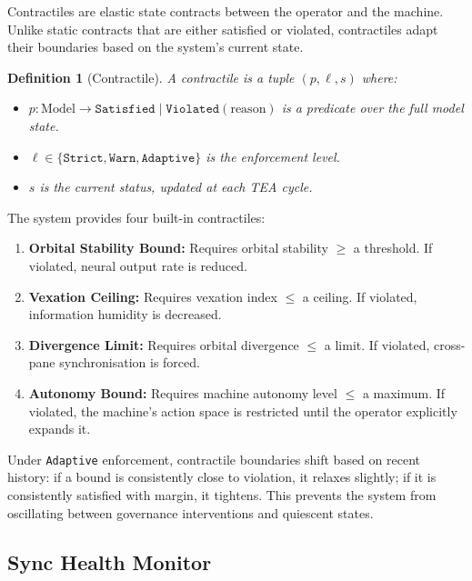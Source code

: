 \documentclass[11pt,a4paper]{article}
\newtheorem{definition}{Definition}[section]
\newcommand{\tea}{\textsc{TEA}}
\begin{document}
Contractiles are elastic state contracts between the operator and
the machine. Unlike static contracts that are either satisfied or
violated, contractiles adapt their boundaries based on the system's
current state.

\begin{definition}[Contractile]\label{def:contractile}
A contractile is a tuple $(p, \ell, s)$ where:
\begin{itemize}
  \item $p : \text{Model} \to \texttt{Satisfied} \mid
    \texttt{Violated}(\text{reason})$ is a predicate over the
    full model state.
  \item $\ell \in \{\texttt{Strict}, \texttt{Warn},
    \texttt{Adaptive}\}$ is the enforcement level.
  \item $s$ is the current status, updated at each \tea{} cycle.
\end{itemize}
\end{definition}

The system provides four built-in contractiles:

\begin{enumerate}
  \item \textbf{Orbital Stability Bound:} Requires
    orbital stability $\geq$ a threshold. If violated, neural
    output rate is reduced.
  \item \textbf{Vexation Ceiling:} Requires vexation index
    $\leq$ a ceiling. If violated, information humidity is
    decreased.
  \item \textbf{Divergence Limit:} Requires orbital divergence
    $\leq$ a limit. If violated, cross-pane synchronisation is
    forced.
  \item \textbf{Autonomy Bound:} Requires machine autonomy level
    $\leq$ a maximum. If violated, the machine's action space is
    restricted until the operator explicitly expands it.
\end{enumerate}

Under \texttt{Adaptive} enforcement, contractile boundaries shift
based on recent history: if a bound is consistently close to
violation, it relaxes slightly; if it is consistently satisfied
with margin, it tightens. This prevents the system from oscillating
between governance interventions and quiescent states.

\subsection{Sync Health Monitor}
\end{document}
